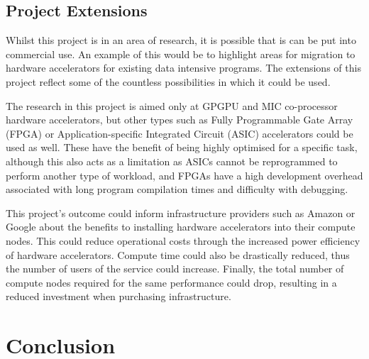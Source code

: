 \documentclass[12pt,a4paper]{article}
\begin{document}
        \subsection{Project Extensions}
        \label{sub:project_extensions}

            Whilst this project is in an area of research, it is possible that is can be put into commercial use. An example of this would be to highlight areas for migration to hardware accelerators for existing data intensive programs. The extensions of this project reflect some of the countless possibilities in which it could be used.

            \begin{description}[style=nextline]
                \item[\textbf{Additional Accelerator Types}] The research in this project is aimed only at GPGPU and MIC co-processor hardware accelerators, but other types such as Fully Programmable Gate Array (FPGA) or Application-specific Integrated Circuit (ASIC) accelerators could be used as well. These have the benefit of being highly optimised for a specific task, although this also acts as a limitation as ASICs cannot be reprogrammed to perform another type of workload, and FPGAs have a high development overhead associated with long program compilation times and difficulty with debugging.
                \item[\textbf{Infrastructure Design}] This project's outcome could inform infrastructure providers such as Amazon or Google about the benefits to installing hardware accelerators into their compute nodes. This could reduce operational costs through the increased power efficiency of hardware accelerators. Compute time could also be drastically reduced, thus the number of users of the service could increase. Finally, the total number of compute nodes required for the same performance could drop, resulting in a reduced investment when purchasing infrastructure.
                \item[\textbf{Additional Workload Testing}] 
            \end{description}
        
    \section{Conclusion}
    \label{sec:conclusion}
    
\end{document}
